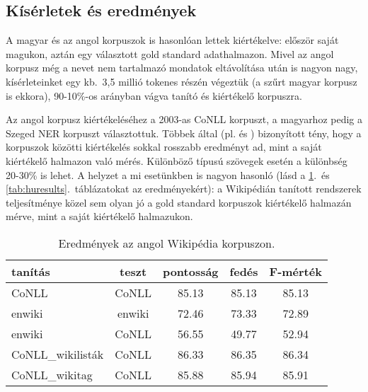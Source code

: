 \documentclass{llncs}
\begin{document}
\subsection{Kísérletek és eredmények}

A magyar és az angol korpuszok is hasonlóan lettek kiértékelve: először saját magukon, aztán egy választott gold standard adathalmazon. Mivel az angol korpusz még a nevet nem tartalmazó mondatok eltávolítása után is nagyon nagy, kísérleteinket egy kb.~3,5 millió tokenes részén végeztük (a szűrt magyar korpusz is ekkora), 90-10\%-os arányban vágva tanító és kiértékelő korpuszra.  

Az angol korpusz kiértékeléséhez a 2003-as CoNLL korpuszt, a magyarhoz pedig a Szeged NER korpuszt választottuk. Többek által (pl. \cite{Nothman:08} és \cite{ciaramita2005}) bizonyított tény, hogy a korpuszok közötti kiértékelés sokkal rosszabb eredményt ad, mint a saját kiértékelő halmazon való mérés. Különböző típusú szövegek esetén a különbség 20-30\% is lehet. A helyzet a mi esetünkben is nagyon hasonló (lásd a \ref{tab:enresults}.~és \ref{tab:huresults}.~táblázatokat az eredményekért): a Wikipédián tanított rendszerek teljesítménye közel sem olyan jó a gold standard korpuszok kiértékelő halmazán mérve, mint a saját kiértékelő halmazukon. 

\begin{table}[ht]
\begin{center}
\begin{tabular}{lcccc}
\toprule 
\textbf{tanítás} & \textbf{teszt} & \textbf{pontosság} & \textbf{fedés} & \textbf{F-mérték} \\ 
\midrule
CoNLL & CoNLL & 85.13 & 85.13 & 85.13 \\
enwiki & enwiki & 72.46 & 73.33 &  72.89 \\
enwiki & CoNLL & 56.55 & 49.77 & 52.94 \\
CoNLL\_wikilisták & CoNLL & 86.33 & 86.35 & 86.34 \\
CoNLL\_wikitag & CoNLL & 85.88 & 85.94 & 85.91 \\
\bottomrule
\end{tabular}
\end{center}
\caption{Eredmények az angol Wikipédia korpuszon.}
\label{tab:enresults}
\end{table}
\end{document}
